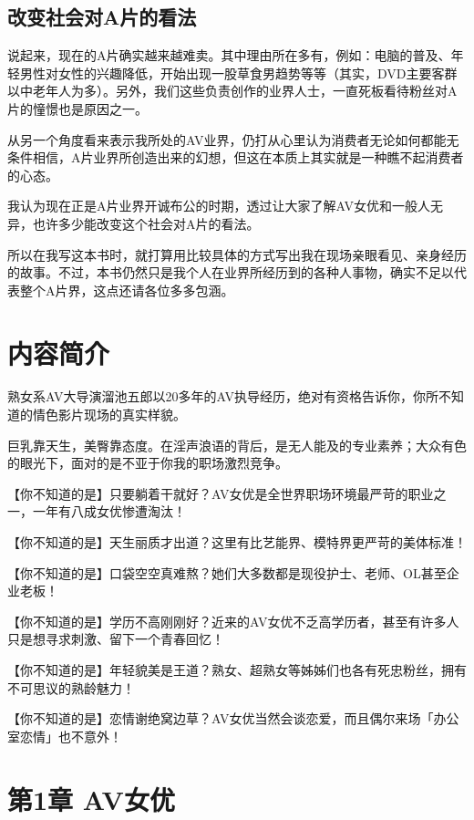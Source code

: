 \documentclass[12pt,UTF8]{ctexbook}
\begin{document}
\section{改变社会对A片的看法}

说起来，现在的A片确实越来越难卖。其中理由所在多有，例如：电脑的普及、年轻男性对女性的兴趣降低，开始出现一股草食男趋势等等（其实，DVD主要客群以中老年人为多）。另外，我们这些负责创作的业界人士，一直死板看待粉丝对A片的憧憬也是原因之一。

从另一个角度看来表示我所处的AV业界，仍打从心里认为消费者无论如何都能无条件相信，A片业界所创造出来的幻想，但这在本质上其实就是一种瞧不起消费者的心态。

我认为现在正是A片业界开诚布公的时期，透过让大家了解AV女优和一般人无异，也许多少能改变这个社会对A片的看法。

所以在我写这本书时，就打算用比较具体的方式写出我在现场亲眼看见、亲身经历的故事。不过，本书仍然只是我个人在业界所经历到的各种人事物，确实不足以代表整个A片界，这点还请各位多多包涵。

\mainmatter

\chapter{内容简介}

熟女系AV大导演溜池五郎以20多年的AV执导经历，绝对有资格告诉你，你所不知道的情色影片现场的真实样貌。

巨乳靠天生，美臀靠态度。在淫声浪语的背后，是无人能及的专业素养；大众有色的眼光下，面对的是不亚于你我的职场激烈竞争。

【你不知道的是】只要躺着干就好？AV女优是全世界职场环境最严苛的职业之一，一年有八成女优惨遭淘汰！

【你不知道的是】天生丽质才出道？这里有比艺能界、模特界更严苛的美体标准！

【你不知道的是】口袋空空真难熬？她们大多数都是现役护士、老师、OL甚至企业老板！

【你不知道的是】学历不高刚刚好？近来的AV女优不乏高学历者，甚至有许多人只是想寻求刺激、留下一个青春回忆！

【你不知道的是】年轻貌美是王道？熟女、超熟女等姊姊们也各有死忠粉丝，拥有不可思议的熟龄魅力！

【你不知道的是】恋情谢绝窝边草？AV女优当然会谈恋爱，而且偶尔来场「办公室恋情」也不意外！

\chapter{第1章 AV女优}
\end{document}
